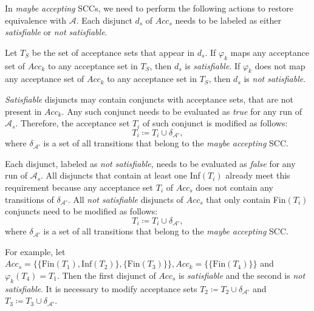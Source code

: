\documentclass[
  digital, %
  twoside, %
  table,   %
  lof,     %
  lot,     %
]{fithesis3}
\begin{document}
In \emph{maybe accepting} SCCs, we need to perform the following actions to restore equivalence with $\mathcal{A}$. Each disjunct $d_s$ of $Acc_s$ needs to be labeled as either \emph{satisfiable} or \emph{not satisfiable}.

Let $T_S$ be the set of acceptance sets that appear in $d_s$. If $\varphi_k$ maps any acceptance set of $Acc_k$ to any acceptance set in $T_S$, then $d_s$ is \emph{satisfiable}. If $\varphi_k$ does not map any acceptance set of $Acc_k$ to any acceptance set in $T_S$, then $d_s$ is \emph{not satisfiable}.

\emph{Satisfiable} disjuncts may contain conjuncts with acceptance sets, that are not present in $Acc_k$. Any such conjunct needs to be evaluated as \emph{true} for any run of $\mathcal{A}_s$. Therefore, the acceptance set $T_i$ of such conjunct is modified as follows:
\begin{equation*}
  T_i \coloneqq T_i \cup \delta_{\mathcal{A'}},
\end{equation*}
where $\delta_{\mathcal{A'}}$ is a set of all transitions that belong to the \emph{maybe accepting} SCC. 

Each disjunct, labeled as \emph{not satisfiable}, needs to be evaluated as \emph{false} for any run of $\mathcal{A}_s$. All disjuncts that contain at least one Inf$(T_i)$ already meet this requirement because any acceptance set $T_i$ of $Acc_s$ does not contain any transitions of $\delta_{\mathcal{A'}}$. All \emph{not satisfiable} disjuncts of $Acc_s$ that only contain Fin$(T_i)$ conjuncts need to be modified as follows:
\begin{equation*}
  T_i \coloneqq T_i \cup \delta_{\mathcal{A'}},
\end{equation*}
where $\delta_{\mathcal{A'}}$ is a set of all transitions that belong to the \emph{maybe accepting} SCC. 

For example, let $Acc_s = \{\{\text{Fin}(T_1), \text{Inf}(T_2)\}, \{\text{Fin}(T_3)\}\}, Acc_k = \{\{\text{Fin}(T_4)\}\}$ and $\varphi_k (T_4) = T_1$. Then the first disjunct of $Acc_s$ is \emph{satisfiable} and the second is \emph{not satisfiable}. It is necessary to modify acceptance sets $T_2 \coloneqq T_2 \cup \delta_{\mathcal{A'}}$ and $T_3 \coloneqq T_3 \cup \delta_{\mathcal{A'}}$.
\end{document}
